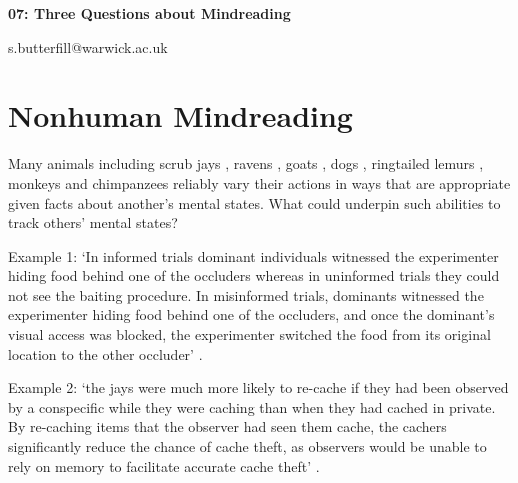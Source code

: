 \documentclass[12pt]{extarticle}
\date{}
\makeatletter
\def \ititle {Philosophical Psychology}
\def \iemail{s.butterfill@warwick.ac.uk}
\makeatother
\begin{document}
\begin{multicols*}{3}

\setlength\footnotesep{1em}









\def \ititle {07: Three Questions about Mindreading}

\begin{center}

{\Large

\textbf{\ititle}

}



\iemail %

\end{center}



\section{Nonhuman Mindreading}


Many animals including scrub jays \citep{Clayton:2007fh},
ravens \citep{bugnyar:2016_ravens},
goats \citep{kaminski:2006_goats},
dogs \citep{kaminski:2009_domestic},
ringtailed lemurs \citep{sandel:2011_evidence},
monkeys \citep{burkart:2007_understanding, hattori:2009_tufted}
and chimpanzees \citep{melis:2006_chimpanzees,karg:2015_chimpanzees,krupenye:2016_great} reliably vary their actions in ways that are appropriate given facts about another’s mental states.
What could underpin such abilities to track others’ mental states?

Example 1: ‘In informed trials dominant individuals witnessed the experimenter hiding
food behind one of the occluders whereas in uninformed trials they could
not see the baiting procedure. In misinformed trials, dominants witnessed
the experimenter hiding food behind one of the occluders, and once the
dominant’s visual access was blocked, the experimenter switched the food
from its original location to the other occluder’ \citep{Hare:2001ph}.

Example 2: ‘the jays were much more likely to re-cache if they had been observed by a conspecific while they
were caching than when they had cached in private. By re-caching items that the observer had seen
them cache, the cachers significantly reduce the chance of cache theft, as observers would be unable
to rely on memory to facilitate accurate cache theft’ \citep[p.~516]{Clayton:2007fh}.


\end{multicols*}
\end{document}
